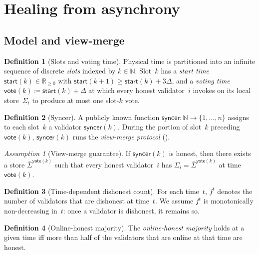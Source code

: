 \documentclass{article}
\newcommand{\syncer}{\mathsf{syncer}}
\newcommand{\start}{\mathsf{start}}
\newcommand{\vote}{\mathsf{vote}}
\newcommand{\comm}[1]{\bar{#1}}
\theoremstyle{plain}
\theoremstyle{definition}
\newtheorem{definition}{Definition}
\theoremstyle{remark}
\newtheorem{assumption}{Assumption}
\newcommand{\OHM}{online-honest majority\xspace}
\begin{document}
\section{Healing from asynchrony}\label{sec:healing}

\subsection{Model and view-merge}\label{rev:sec:healing-model}

\begin{definition}[Slots and voting time]\label{rev:def:slots}
Physical time is partitioned into an infinite sequence of discrete \emph{slots} indexed by $k \in \mathbb{N}$.
Slot~$k$ has a \emph{start time} $\start(k) \in \mathbb{R}_{\geq 0}$ with $\start(k+1) \geq \start(k) + 3\Delta$, and a \emph{voting time} $\vote(k) \coloneqq \start(k) + \Delta$ at which every honest validator~$i$ invokes  on its local store~$\Sigma_i$ to produce at most one slot-$k$ vote.
\end{definition}

\begin{definition}[Syncer]\label{rev:def:syncer}
A publicly known function $\syncer \colon \mathbb{N} \to \{1, \ldots, n\}$ assigns to each slot~$k$ a validator $\syncer(k)$.
During the portion of slot~$k$ preceding $\vote(k)$, $\syncer(k)$ runs the \emph{view-merge protocol} ().
\end{definition}

\begin{assumption}[View-merge guarantee]\label{rev:ass:view-merge}
If $\syncer(k)$ is honest, then there exists a store $\comm{\Sigma}^{\vote(k)}$ such that every honest validator~$i$ has $\Sigma_i = \comm{\Sigma}^{\vote(k)}$ at time $\vote(k)$.
\end{assumption}

\begin{definition}[Time-dependent dishonest count]\label{rev:def:f-t}
For each time~$t$, $f^t$ denotes the number of validators that are dishonest at time~$t$. We assume $f^t$ is monotonically non-decreasing in~$t$: once a validator is dishonest, it remains so.
\end{definition}

\begin{definition}[Online-honest majority]\label{rev:def:online-honest-majority}
The \emph{\OHM} holds at a given time iff more than half of the validators that are online at that time are honest.
\end{definition}
\end{document}
